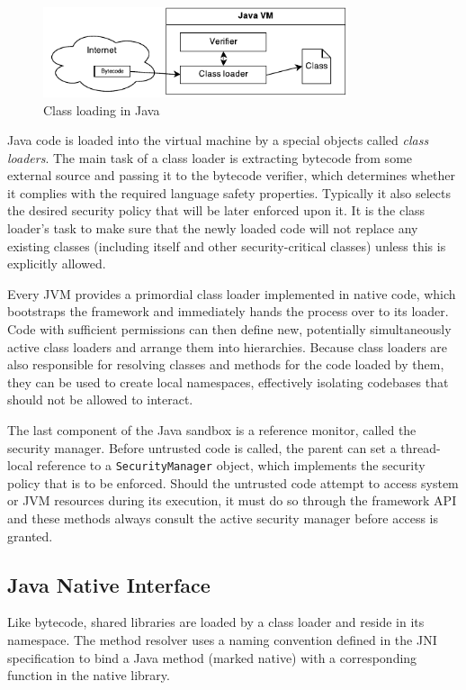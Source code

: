 \documentclass[a4paper,12pt,twoside,openright]{report}
\newcommand{\keyword}[1]{\textsf{#1}}
\newcommand{\class}[1]{\texttt{#1}}
\begin{document}
\begin{figure}
	\centering
	\includegraphics[width=0.8\textwidth]{dia_java_classload.pdf}
	\caption{Class loading in Java}
\end{figure}

Java code is loaded into the virtual machine by a special objects called \emph{class loaders}. The main task of a class loader is extracting bytecode from some external source and passing it to the bytecode verifier, which determines whether it complies with the required language safety properties. Typically it also selects the desired security policy that will be later enforced upon it. It is the class loader's task to make sure that the newly loaded code will not replace any existing classes (including itself and other security-critical classes) unless this is explicitly allowed. 

Every JVM provides a primordial class loader implemented in native code, which bootstraps the framework and immediately hands the process over to its loader. Code with sufficient permissions can then define new, potentially simultaneously active class loaders and arrange them into hierarchies. Because class loaders are also responsible for resolving classes and methods for the code loaded by them, they can be used to create local namespaces, effectively isolating codebases that should not be allowed to interact.

The last component of the Java sandbox is a reference monitor, called the security manager. Before untrusted code is called, the parent can set a thread-local reference to a \class{SecurityManager} object, which implements the security policy that is to be enforced. Should the untrusted code attempt to access system or JVM resources during its execution, it must do so through the framework API and these methods always consult the active security manager before access is granted.

\subsection{Java Native Interface}

Like bytecode, shared libraries are loaded by a class loader and reside in its namespace. The method resolver uses a naming convention defined in the JNI specification to bind a Java method (marked \keyword{native}) with a corresponding function in the native library.
\end{document}
